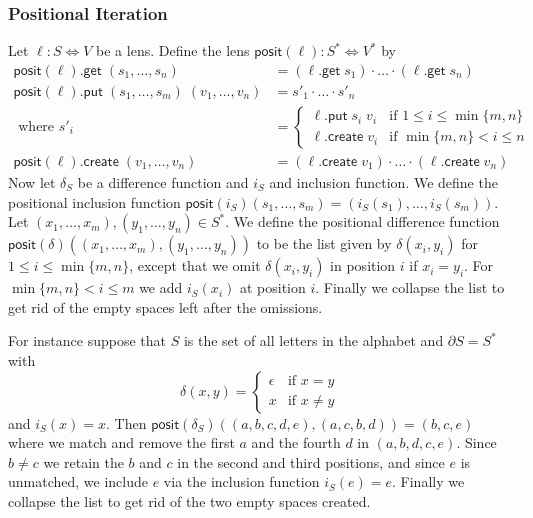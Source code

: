 \documentclass[acmsmall,review,anonymous]{acmart}\settopmatter{printfolios=true,printccs=false,printacmref=false}
\newcommand{\kw}[1]{\ensuremath{\mathsf{#1}}\xspace}
\newcommand{\get}{\ensuremath{\kw{get}}\xspace}
\newcommand{\pput}{\ensuremath{\kw{put}}\xspace}
\newcommand{\create}{\ensuremath{\kw{create}}\xspace}
\newcommand{\pos}{\ensuremath{\kw{posit}}\xspace}
\begin{document}
\subsubsection{Positional Iteration}
Let $\ell: S \Leftrightarrow V$ be a lens. Define the lens $\pos(\ell):
S^* \Leftrightarrow V^*$ by
\begin{align*}
\pos(\ell) .\get \; (s_1, \ldots, s_n) &= (\ell.\get \; s_1) \cdot \ldots \cdot
(\ell.\get \; s_n)\\
\pos(\ell) .\pput \; (s_1, \ldots, s_m) \; (v_1, \ldots, v_n) &= s'_1 \cdot
\ldots \cdot s'_n\\
\text{ where } s'_i &= \begin{cases}
\ell.\pput \; s_i \; v_i & \text{if } 1 \leq i \leq \min\{m, n\}\\
\ell.\create \; v_i & \text{if } \min\{m, n\} < i \leq n
\end{cases}\\
\pos(\ell).\create \; (v_1, \ldots, v_n) &= (\ell.\create \; v_1) \cdot \ldots
\cdot (\ell.\create \; v_n)
\end{align*}
Now let $\delta_S$ be a difference function and $i_S$ and inclusion function.
We define the positional inclusion function $\pos(i_S)(s_1, \ldots, s_m) =
(i_S(s_1), \ldots, i_S(s_m))$. Let $(x_1, \ldots, x_m), (y_1, \ldots, y_n) \in
S^*$. We define the positional difference function $\pos(\delta)((x_1, \ldots,
x_m), (y_1, \ldots, y_n))$ to be the list given by $\delta(x_i, y_i)$ for $1
\leq i \leq \min\{m, n\}$, except that we omit $\delta(x_i, y_i)$ in position
$i$ if $x_i = y_i$. For $\min\{m, n\} < i \leq m$ we add $i_S(x_i)$ at position
$i$. Finally we collapse the list to get rid of the empty spaces left after the
omissions.

For instance suppose that $S$ is the set of all letters in the alphabet and
$\partial S = S^*$ with $$\delta(x, y) =
\begin{cases}
\epsilon & \text{if } x = y\\
x & \text{if } x \neq y
\end{cases}$$
and $i_S(x) = x$. Then $\pos(\delta_S)((a, b, c, d, e), (a, c, b, d)) = (b, c,
e)$ where we match and remove the first $a$ and the fourth $d$ in $(a, b, d, c,
e)$. Since $b \neq c$ we retain the $b$ and $c$ in the second and third
positions, and since $e$ is unmatched, we include $e$ via the inclusion
function $i_S(e) = e$. Finally we collapse the list to get rid of the two empty
spaces created.
\end{document}
